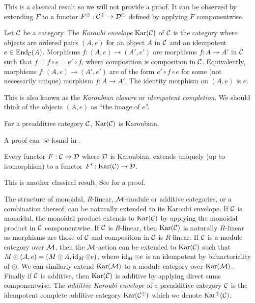 This is a classical result so we will not provide a proof. It can be observed by extending $F$ to a functor $F^\oplus: \mathcal{C}^\oplus \to \mathcal{D}^\oplus$ defined by applying $F$ componentwise.

\begin{definition}
    Let $\mathcal{C}$ be a category. The \textit{Karoubi envelope} $\operatorname{Kar}(\mathcal{C})$ of $\mathcal{C}$ is the category where objects are ordered pairs $(A,e)$ for an object $A$ in $\mathcal{C}$ and an idempotent $e \in \operatorname{End}_{\mathcal{C}}(A)$.  Morphisms $f: (A, e) \to (A', e')$ are morphisms $f:A \to A'$ in $\mathcal{C}$ such that $f = f \circ e = e' \circ f$, where composition is composition in $\mathcal{C}$. Equivalently, morphisms $f: (A, e) \to (A', e')$ are of the form $e'\circ f \circ e$ for some (not necessarily unique) morphism $f: A \to A'$. The identity morphism on $(A,e)$ is $e$.
\end{definition}

This is also known as the \textit{Karoubian closure} or \textit{idempotent completion}. We should think of the objects $(A,e)$ as ``the image of $e$''.

\begin{proposition}
    For a preadditive category $\mathcal{C}$, $\operatorname{Kar}(\mathcal{C})$ is Karoubian.
\end{proposition}

A proof can be found in \cite[Lemma 11.17]{intro-soergel-bimodules}.

\begin{lemma}
    Every functor $F: \mathcal{C} \to \mathcal{D}$ where $\mathcal{D}$ is Karoubian, extends uniquely (up to isomorphism) to a functor $F': \operatorname{Kar}(\mathcal{C}) \to \mathcal{D}$.
\end{lemma}

This is another classical result. See \cite[Proposition 6.5.9 (1)]{borceux-categorical-algebra} for a proof.

The structure of monoidal, $R$-linear, $\mathcal{M}$-module or additive categories, or a combination thereof, can be naturally extended to its Karoubi envelope. If $\mathcal{C}$ is monoidal, the monoidal product extends to $\operatorname{Kar}(\mathcal{C})$ by applying the monoidal product in $\mathcal{C}$ componentwise. If $\mathcal{C}$ is $R$-linear, then $\operatorname{Kar}(\mathcal{C})$ is naturally $R$-linear as morphisms are those of $\mathcal{C}$ and composition in $\mathcal{C}$ is $R$-linear. If $\mathcal{C}$ is a module category over $\mathcal{M}$, then the $\mathcal{M}$-action can be extended to $\operatorname{Kar}(\mathcal{C})$ such that $M \odot (A,e) = (M \odot A, \operatorname{id}_M \odot e)$, where $\operatorname{id}_M \odot e$ is an idempotent by bifunctoriality of $\odot$. We can similarly extend $\operatorname{Kar}(\mathcal{M})$ to a module category over $\operatorname{Kar}(\mathcal{M})$. Finally if $\mathcal{C}$ is additive, then $\operatorname{Kar}(\mathcal{C})$ is additive by applying direct sums componentwise. The \textit{additive Karoubi envelope} of a preadditive category $\mathcal{C}$ is the idempotent complete additive category $\operatorname{Kar}(\mathcal{C}^\oplus)$ which we denote $\operatorname{Kar^\oplus}(\mathcal{C})$.

